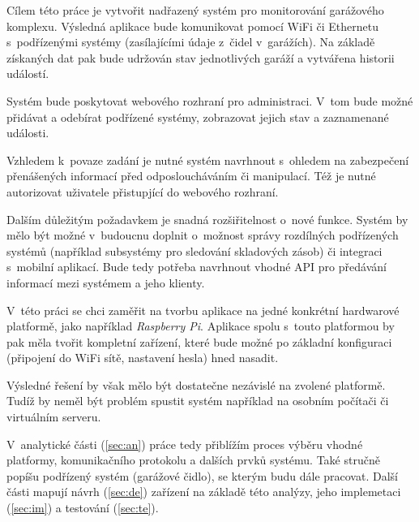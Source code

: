Cílem této práce je vytvořit nadřazený systém pro monitorování garážového komplexu. Výsledná aplikace bude komunikovat pomocí WiFi či Ethernetu s~podřízenými systémy (zasílajícími údaje z~čidel v~garážích). Na základě získaných dat pak bude udržován stav jednotlivých garáží a vytvářena historii událostí.

Systém bude poskytovat webového rozhraní pro administraci. V~tom bude možné přidávat a odebírat podřízené systémy, zobrazovat jejich stav a zaznamenané události.

Vzhledem k~povaze zadání je nutné systém navrhnout s~ohledem na zabezpečení přenášených informací před odposloucháváním či manipulací. Též je nutné autorizovat uživatele přistupjící do webového rozhraní.

Dalším důležitým požadavkem je snadná rozšiřitelnost o~nové funkce. Systém by mělo být možné v~budoucnu doplnit o~možnost správy rozdílných podřízených systémů (například subsystémy pro sledování skladových zásob) či integraci s~mobilní aplikací. Bude tedy potřeba navrhnout vhodné API pro předávání informací mezi systémem a jeho klienty. 

V~této práci se chci zaměřit na tvorbu aplikace na jedné konkrétní hardwarové platformě, jako například \textit{Raspberry Pi}. Aplikace spolu s~touto platformou by pak měla tvořit kompletní zařízení, které bude možné po základní konfiguraci (připojení do WiFi sítě, nastavení hesla) hned nasadit.

Výsledné řešení by však mělo být dostatečne nezávislé na zvolené platformě. Tudíž by neměl být problém spustit systém například na osobním počítači či virtuálním serveru.

V~analytické části (\ref{sec:an}) práce tedy přiblížím proces výběru vhodné platformy, komunikačního protokolu a dalších prvků systému. Také stručně popíšu podřízený systém (garážové čidlo), se kterým budu dále pracovat. Další části mapují návrh (\ref{sec:de}) zařízení na základě této analýzy, jeho implemetaci (\ref{sec:im}) a testování (\ref{sec:te}).